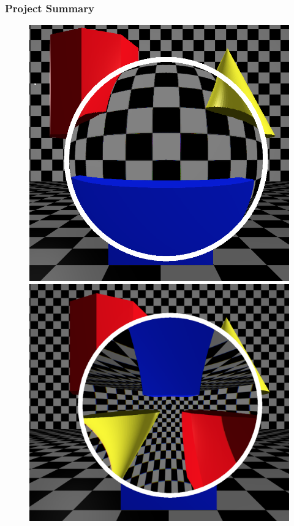 \documentclass{beamer}
\begin{document}
\begin{frame}
    \frametitle{Project Summary}
    \begin{figure}[htpb]
        \centering
            \includegraphics[height=0.35\textheight]{images/barrel}
            \includegraphics[height=0.35\textheight]{images/pincushion}\\

\end{figure}
\end{frame}
\end{document}
